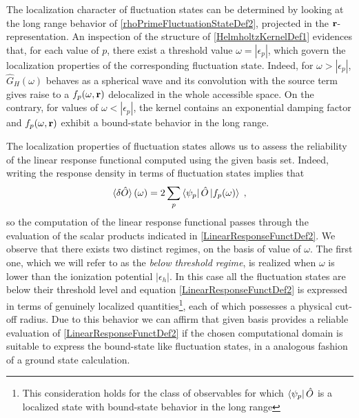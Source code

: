 \documentclass[reprint,aps,prb]{revtex4-1}
\renewcommand{\r}{{\bf r}}
\newcommand{\eps}{\epsilon}
\newcommand{\be}{\begin{equation}}
\newcommand{\ee}{\end{equation}}
\newcommand{\lb}{\label}
\newcommand{\op}[1]{\hat {#1}}
\begin{document}
The localization character of fluctuation states can be determined by looking at the long range behavior of \eqref{rhoPrimeFluctuationStateDef2}, projected in the $\r$-representation.
An inspection of the structure of \eqref{HelmholtzKernelDef1} evidences that, for each value of $p$, there exist a threshold value $\omega = |\eps_p|$, which govern the localization 
properties of the corresponding fluctuation state. Indeed, for $\omega > |\eps_p|$,  $\op G_H(\omega)$ behaves as a spherical wave and its convolution with the source term  gives 
raise to a $f_p(\omega,\r)$ delocalized in the whole accessible space. On the contrary, for values of $\omega < |\eps_p|$, %
the kernel contains an exponential damping factor and $f_p(\omega,\r)$ exhibit a bound-state behavior in the long range.   


The localization properties of fluctuation states allows us to assess the reliability of the linear response functional computed using the given basis set. Indeed, writing the response 
density in terms of fluctuation states implies that 
\be\lb{LinearResponseFunctDef2}
\braket{\delta\op O}(\omega) = 2\sum_p \bra{\psi_p}\op O\ket{f_p(\omega)} \;,
\ee
so the computation of the linear response functional passes through the evaluation of the scalar products indicated in \eqref{LinearResponseFunctDef2}. We observe that there exists two 
distinct regimes, on the basis of value of $\omega$. The first one, which we will refer to as the \emph{below threshold regime}, is realized when $\omega$ is lower than the ionization 
potential $|\eps_h|$. In this case all the fluctuation states are below their threshold level and equation \eqref{LinearResponseFunctDef2} is expressed in terms of genuinely localized 
quantities\footnote{This consideration holds for the class of observables for which $\bra{\psi_p}\op O$ is a localized state  with bound-state behavior in the long range}, each of which 
possesses a physical cut-off radius. Due to this behavior we can affirm that given basis provides a reliable evaluation of \eqref{LinearResponseFunctDef2} if the chosen computational domain 
is suitable to express the bound-state like fluctuation states, in a analogous fashion of a ground state calculation. 
\end{document}

